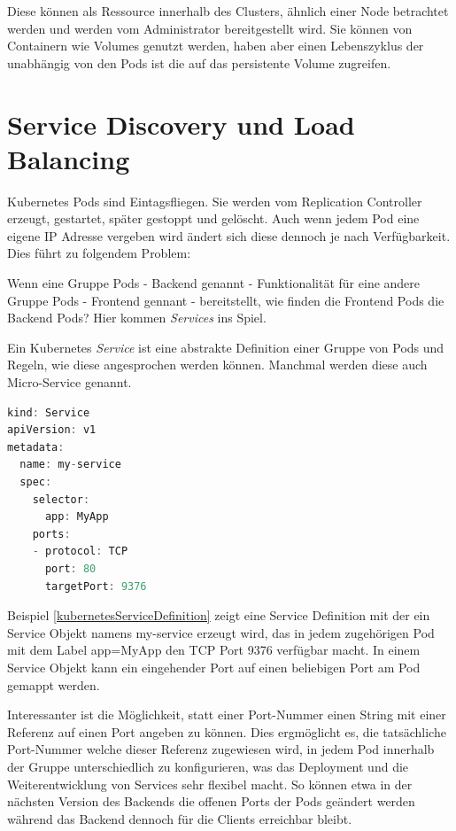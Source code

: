 Diese können als Ressource innerhalb des Clusters, ähnlich einer Node betrachtet werden und werden vom Administrator bereitgestellt wird.
Sie können von Containern wie Volumes genutzt werden, haben aber einen Lebenszyklus der unabhängig von den Pods ist die auf das persistente Volume zugreifen.
\newpage

\section{Service Discovery und Load Balancing}

Kubernetes Pods sind Eintagsfliegen.
Sie werden vom Replication Controller erzeugt, gestartet, später gestoppt und gelöscht.
Auch wenn jedem Pod eine eigene IP Adresse vergeben wird ändert sich diese dennoch je nach Verfügbarkeit. 
Dies führt zu folgendem Problem:

Wenn eine Gruppe Pods - Backend genannt - Funktionalität für eine andere Gruppe Pods - Frontend gennant - bereitstellt, wie finden die Frontend Pods die Backend Pods?
Hier kommen \textit{Services} ins Spiel.

Ein Kubernetes \textit{Service} ist eine abstrakte Definition einer Gruppe von Pods und Regeln, wie diese angesprochen werden können. Manchmal werden diese auch Micro-Service genannt.

\begin{minipage}{\linewidth}
\begin{lstlisting}[frame=single,caption=Kubernetes Service Definition, label=kubernetesServiceDefinition, language=Scala]
kind: Service
apiVersion: v1
metadata:
  name: my-service
  spec:
    selector:
      app: MyApp
    ports:
    - protocol: TCP
      port: 80
      targetPort: 9376
\end{lstlisting}
\end{minipage}

Beispiel \ref{kubernetesServiceDefinition} zeigt eine Service Definition mit der ein Service Objekt namens \glqq{}my-service\grqq{} erzeugt wird, das in jedem zugehörigen Pod mit dem Label \glqq{}app=MyApp\grqq{} den TCP Port 9376 verfügbar macht.
In einem Service Objekt kann ein eingehender Port auf einen beliebigen Port am Pod gemappt werden.

Interessanter ist die Möglichkeit, statt einer Port-Nummer einen String mit einer Referenz auf einen Port angeben zu können.
Dies ergmöglicht es, die tatsächliche Port-Nummer welche dieser Referenz zugewiesen wird, in jedem Pod innerhalb der Gruppe unterschiedlich zu konfigurieren, was das Deployment und die Weiterentwicklung von Services sehr flexibel macht.
So können etwa in der nächsten Version des Backends die offenen Ports der Pods geändert werden während das Backend dennoch für die Clients erreichbar bleibt.

